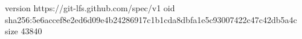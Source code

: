 version https://git-lfs.github.com/spec/v1
oid sha256:5e6accef8e2ed6d09e4b24286917c1b1cda8dbfa1e5c93007422c47c42db5a4c
size 43840
